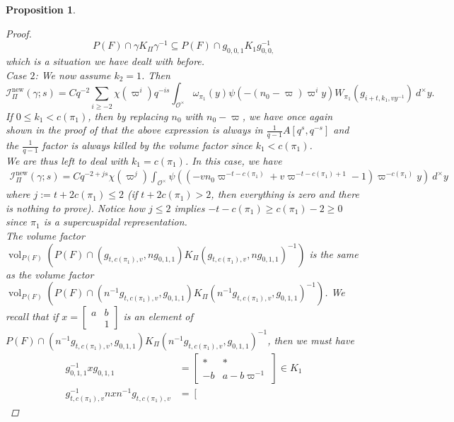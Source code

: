 \documentclass{amsart}
\theoremstyle{plain}
\newtheorem{prop}[thm]{Proposition}
\theoremstyle{plain}
\theoremstyle{remark}
\DeclareMathOperator{\vol}{vol}
\begin{document}
\begin{prop}
\begin{proof}
        $$P(F)\cap \gamma K_\Pi\gamma^{-1}\subseteq P(F)\cap g_{0,0,1}K_1 g_{0,0,}^{-1}$$
        which is a situation we have dealt with before.\\
        \textit{Case} $2$: We now assume $k_2=1$. Then 
        $$\mathcal{I}_{\Pi}^\mathrm{new}(\gamma;s)=Cq^{-2}\sum_{i\geq -2}\chi(\varpi^i)q^{-is}\int_{\mathcal{O}^\times}\omega_{\pi_1}(y)\psi(-(n_0-\varpi)\varpi^iy)W_{\pi_1}(g_{i+t,k_1,vy^{-1}})\ d^\times y. $$
        If $0\leq k_1<c(\pi_1)$, then by replacing $n_0$ with $n_0-\varpi$, we have once again shown in the proof of  that the above expression is always in $\tfrac{1}{q-1}A[q^s,q^{-s}]$ and the $\tfrac{1}{q-1}$ factor is always killed by the volume factor since $k_1<c(\pi_1)$. \\
        We are thus left to deal with $k_1=c(\pi_1)$. In this case, we have 
        \begin{align}\label{eq: 34}\mathcal{I}_{\Pi}^\mathrm{new}(\gamma ;s)=Cq^{-2+js}\chi(\varpi^j)\int_{\mathcal{O}^\times}\psi\left((-vn_0\varpi^{-t-c(\pi_1)}+v\varpi^{-t-c(\pi_1)+1}-1)\varpi^{-c(\pi_1)}y\right)\ d^\times y\end{align}
        where $j:=t+2c(\pi_1)\leq 2$ (if $t+2c(\pi_1) > 2$, then everything is zero and there is nothing to prove). Notice how $j\leq 2$ implies $-t-c(\pi_1)\geq c(\pi_1)-2\geq 0$ since $\pi_1$ is a supercuspidal representation.\\
            The volume factor $\vol_{P(F)}(P(F)\cap (g_{t,c(\pi_1),v},n g_{0,1,1}) K_\Pi  (g_{t,c(\pi_1),v},n g_{0,1,1})^{-1}) $ is the same as the volume factor $ \vol_{P(F)}(P(F)\cap (n^{-1}g_{t,c(\pi_1),v},g_{0,1,1}) K_\Pi  (n^{-1}g_{t,c(\pi_1),v},g_{0,1,1})^{-1})$. We recall that if $x=\left[\begin{smallmatrix}
                a & b \\
                & 1
            \end{smallmatrix}\right] $ is an element of $P(F)\cap (n^{-1}g_{t,c(\pi_1),v},g_{0,1,1}) K_\Pi  (n^{-1}g_{t,c(\pi_1),v},g_{0,1,1})^{-1}$, then we must have 
            \begin{align}\label{eq: 35}
    g_{0,1,1}^{-1}xg_{0,1,1}&=\left[\begin{smallmatrix}
                    * & * \\
                    -b & a-b\varpi^{-1}
                \end{smallmatrix}\right]\in K_1\\
            g_{t,c(\pi_1),v}^{-1}nxn^{-1}g_{t,c(\pi_1),v}&=\left[\begin{smallmatrix}

\end{smallmatrix}
\end{align}
\end{proof}
\end{prop}
\end{document}
